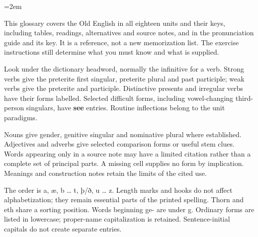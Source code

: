 \newcommand{\runningtitle}{Old English–English}

\usepackage{multicol}
\raggedcolumns
\newcommand{\needspace}[1]{\par\begingroup\skip0=\lastskip\vskip-\skip0\dimen0=#1\relax\advance\dimen0 by\skip0\vskip0pt plus\dimen0\penalty-100\vskip0pt plus-\dimen0\vskip\dimen0\penalty9999\vskip-\dimen0\vskip\skip0\endgroup}
\setlength{\columnsep}{6mm}
\emergencystretch=2em

\raggedright
{}
\fontsize{10.5}{13.2}\selectfont
This glossary covers the Old English in all eighteen units and their keys, including tables, readings, alternatives and source notes, and in the pronunciation guide and its key. It is a reference, not a new memorization list. The exercise instructions still determine what you must know and what is supplied.\par
Look under the dictionary headword, normally the infinitive for a verb. Strong verbs give the preterite first singular, preterite plural and past participle; weak verbs give the preterite and participle. Distinctive presents and irregular verbs have their forms labelled. Selected difficult forms, including vowel-changing third-person singulars, have \textbf{see} entries. Routine inflections belong to the unit paradigms.\par
Nouns give gender, genitive singular and nominative plural where established. Adjectives and adverbs give selected comparison forms or useful stem clues. Words appearing only in a source note may have a limited citation rather than a complete set of principal parts. A missing cell supplies no form by implication. Meanings and construction notes retain the limits of the cited use.\par
The order is a, æ, b … t, þ/ð, u … z. Length marks and hooks do not affect alphabetization; they remain essential parts of the printed spelling. Thorn and eth share a sorting position. Words beginning ge- are under g. Ordinary forms are listed in lowercase; proper-name capitalization is retained. Sentence-initial capitals do not create separate entries.\par
